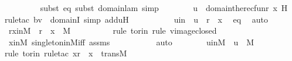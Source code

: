 \begin{isabellebody}
\ \ \ \ \ \ \ \ \isamarkupfalse%
{\isacharparenleft}{\kern0pt}subst\ eq{}{\isacharcomma}{\kern0pt}\ subst\ domain{\isacharunderscore}{\kern0pt}lam{\isacharcomma}{\kern0pt}\ simp{\isacharparenright}{\kern0pt}\isanewline
\ \ \ \ \ \ \isamarkupfalse%
\ {\isachardoublequoteopen}u\ {\isasymin}\ domain{\isacharparenleft}{\kern0pt}the{\isacharunderscore}{\kern0pt}recfun{\isacharparenleft}{\kern0pt}r{\isacharcomma}{\kern0pt}\ x{\isacharcomma}{\kern0pt}\ H{\isacharparenright}{\kern0pt}{\isacharparenright}{\kern0pt}{\isachardoublequoteclose}\ \isamarkupfalse%
{\isacharparenleft}{\kern0pt}rule{\isacharunderscore}{\kern0pt}tac\ b{\isacharequal}{\kern0pt}v\ \ domainI{\isacharcomma}{\kern0pt}\ simp\ add{\isacharcolon}{\kern0pt}uH{\isacharparenright}{\kern0pt}\ \isanewline
\ \ \ \ \ \ \isamarkupfalse%
\ \isamarkupfalse%
\ uin\ {\isacharcolon}{\kern0pt}\ {\isachardoublequoteopen}u\ {\isasymin}\ r\ {\isacharminus}{\kern0pt}{\isacharbackquote}{\kern0pt}{\isacharbackquote}{\kern0pt}\ {\isacharbraceleft}{\kern0pt}x{\isacharbraceright}{\kern0pt}{\isachardoublequoteclose}\ \isamarkupfalse%
\ eq\ \isamarkupfalse%
\ auto\ \isanewline
\isanewline
\ \ \ \ \ \ \isamarkupfalse%
\ rxinM\ {\isacharcolon}{\kern0pt}\ {\isachardoublequoteopen}r\ {\isacharminus}{\kern0pt}{\isacharbackquote}{\kern0pt}{\isacharbackquote}{\kern0pt}\ {\isacharbraceleft}{\kern0pt}x{\isacharbraceright}{\kern0pt}\ {\isasymin}\ M{\isachardoublequoteclose}\ \isanewline
\ \ \ \ \ \ \ \ \isamarkupfalse%
{\isacharparenleft}{\kern0pt}rule\ to{\isacharunderscore}{\kern0pt}rin{\isacharcomma}{\kern0pt}\ rule\ vimage{\isacharunderscore}{\kern0pt}closed{\isacharparenright}{\kern0pt}\isanewline
\ \ \ \ \ \ \ \ \isamarkupfalse%
\ xinM\ singleton{\isacharunderscore}{\kern0pt}in{\isacharunderscore}{\kern0pt}M{\isacharunderscore}{\kern0pt}iff\ assms\ \isanewline
\ \ \ \ \ \ \ \ \isamarkupfalse%
\ auto\isanewline
\ \ \ \ \ \ \isamarkupfalse%
\ uinM\ {\isacharcolon}{\kern0pt}\ {\isachardoublequoteopen}u\ {\isasymin}\ M{\isachardoublequoteclose}\ \isanewline
\ \ \ \ \ \ \ \ \isamarkupfalse%
{\isacharparenleft}{\kern0pt}rule\ to{\isacharunderscore}{\kern0pt}rin{\isacharcomma}{\kern0pt}\ rule{\isacharunderscore}{\kern0pt}tac\ x{\isacharequal}{\kern0pt}{\isachardoublequoteopen}r\ {\isacharminus}{\kern0pt}{\isacharbackquote}{\kern0pt}{\isacharbackquote}{\kern0pt}\ {\isacharbraceleft}{\kern0pt}x{\isacharbraceright}{\kern0pt}{\isachardoublequoteclose}\ \ transM{\isacharparenright}{\kern0pt}\isanewline

\end{isabellebody}
